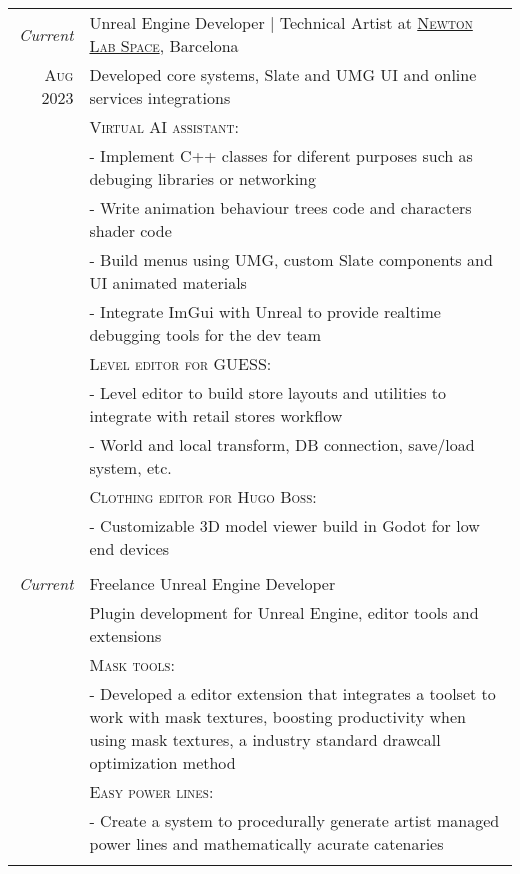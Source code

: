 \documentclass[a4paper,10pt]{article} %
\begin{document}
{\begin{tabular}{r|p{11cm}}
\emph{Current} &  Unreal Engine Developer | Technical Artist at \href{https://www.newtonlabspace.com}{\textsc{Newton Lab Space}}, Barcelona \\
\textsc{Aug 2023} & \footnotesize{Developed core systems, Slate and UMG UI and online services integrations}\\
& \textsc{Virtual AI assistant}: \\
& \footnotesize{- Implement C++ classes for diferent purposes such as debuging libraries or networking}\\
& \footnotesize{- Write animation behaviour trees code and characters shader code}\\
& \footnotesize{- Build menus using UMG, custom Slate components and UI animated materials}\\
& \footnotesize{- Integrate ImGui with Unreal to provide realtime debugging tools for the dev team}\\
& \textsc{Level editor for GUESS}: \\
& \footnotesize{- Level editor to build store layouts and utilities to integrate with retail stores workflow}\\
& \footnotesize{- World and local transform, DB connection, save/load system, etc.}\\
& \textsc{Clothing editor for Hugo Boss}: \\
& \footnotesize{- Customizable 3D model viewer build in Godot for low end devices}\\
\multicolumn{2}{c}{} \\


\emph{Current} & Freelance Unreal Engine Developer \\
& \footnotesize{Plugin development for Unreal Engine, editor tools and extensions}\\
& \textsc{Mask tools}: \\
& \footnotesize{- Developed a editor extension that integrates a toolset to work with mask textures, boosting productivity when using mask textures, a industry standard drawcall optimization method}\\
& \textsc{Easy power lines}: \\
& \footnotesize{- Create a system to procedurally generate artist managed power lines and mathematically acurate catenaries}\\
\multicolumn{2}{c}{} \\


\end{tabular}}
\end{document}
